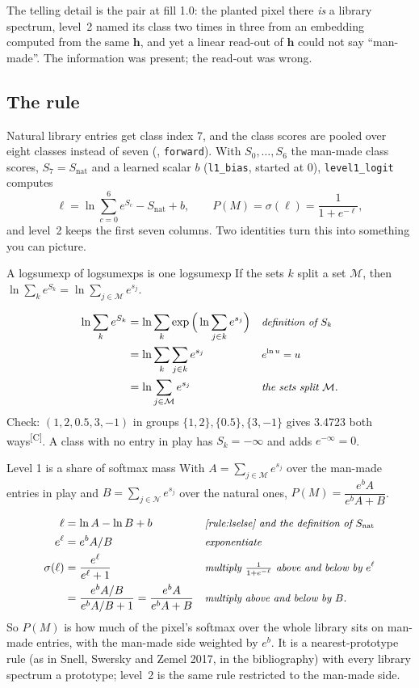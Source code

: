\documentclass[11pt,a4paper,oneside,openany]{book}
\newcommand{\B}[1]{{\symbf{#1}}}
\newcommand{\B}[1]{{\bm{#1}}}
\newcommand{\comp}{\textsuperscript{\textsf{\scriptsize[C]}}}
\newcommand{\vh}{\B{h}}
\newcommand{\why}[1]{&&\text{\small\itshape #1}}
\begin{document}
The telling detail is the pair at fill 1.0: the planted pixel there \emph{is} a library spectrum, level~2 named its class two times in three from an embedding computed from
the same $\vh$, and yet a linear read-out of $\vh$ could not say ``man-made''. The information was present; the read-out was wrong.

\subsection{The rule}

Natural library entries get class index 7, and the class scores are pooled over eight classes instead of seven (, \texttt{forward}). With $S_0,\dots,S_6$ the
man-made class scores, $S_7=S_{\mathrm{nat}}$ and a learned scalar $b$ (\texttt{l1\_bias}, started at 0), \texttt{level1\_logit} computes
\begin{equation}
\ell=\ln\sum_{c=0}^{6}e^{S_c}-S_{\mathrm{nat}}+b,\qquad P(M)=\sigma(\ell)=\frac{1}{1+e^{-\ell}},
\label{eq:asbuilt:l1}
\end{equation}
and level~2 keeps the first seven columns. Two identities turn this into something you can picture.

\begin{rulebox}[label=rule:lselse]{A logsumexp of logsumexps is one logsumexp}
If the sets $k$ split a set $\mathcal M$, then $\ln\sum_ke^{S_k}=\ln\sum_{j\in\mathcal M}e^{s_j}$.
\end{rulebox}
\begin{align*}
\ln\sum_ke^{S_k} &= \ln\sum_k\exp\Big(\ln\sum_{j\in k}e^{s_j}\Big) \why{definition of $S_k$}\\
&= \ln\sum_k\sum_{j\in k}e^{s_j} \why{$e^{\ln u}=u$}\\
&= \ln\sum_{j\in\mathcal M}e^{s_j} \why{the sets split $\mathcal M$.}
\end{align*}
Check: $(1,2,0.5,3,-1)$ in groups $\{1,2\},\{0.5\},\{3,-1\}$ gives 3.4723 both ways\comp. A class with no entry in play has $S_k=-\infty$ and adds $e^{-\infty}=0$.

\begin{rulebox}[label=rule:share]{Level 1 is a share of softmax mass}
With $A=\sum_{j\in\mathcal M}e^{s_j}$ over the man-made entries in play and $B=\sum_{j\in\mathcal N}e^{s_j}$ over the natural ones,
$P(M)=\dfrac{e^bA}{e^bA+B}$.
\end{rulebox}
\begin{align*}
\ell &= \ln A-\ln B+b \why{\cref{rule:lselse} and the definition of $S_{\mathrm{nat}}$}\\
e^{\ell} &= e^{b}A/B \why{exponentiate}\\
\sigma(\ell) &= \frac{e^{\ell}}{e^{\ell}+1} \why{multiply $\tfrac{1}{1+e^{-\ell}}$ above and below by $e^{\ell}$}\\
&= \frac{e^{b}A/B}{e^{b}A/B+1}=\frac{e^{b}A}{e^{b}A+B} \why{multiply above and below by $B$.}
\end{align*}
So $P(M)$ is how much of the pixel's softmax over the whole library sits on man-made entries, with the man-made side weighted by $e^{b}$. It is a nearest-prototype rule
(as in Snell, Swersky and Zemel 2017, in the bibliography) with every library spectrum a prototype; level~2 is the same rule restricted to the man-made side.
\end{document}
